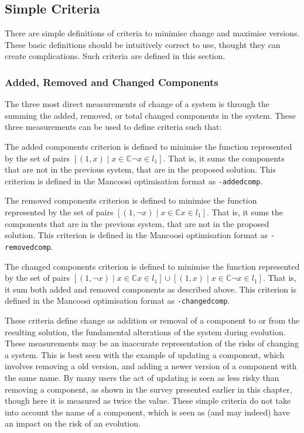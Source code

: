 \subsection{Simple Criteria}
There are simple definitions of criteria to minimise change and maximise versions.
These basic definitions should be intuitively correct to use, thought they can create complications.
Such criteria are defined in this section.

\subsubsection{Added, Removed and Changed Components}
The three most direct measurements of change of a system is through the summing the added, removed, or total changed components in the system.
These three measurements can be used to define criteria such that:
\begin{defs}
	  The added components criterion is defined to minimise the function
	represented by the set of pairs $[(1,x) \mid x \in \mathbb{C} \neg x \in l_1]$.
	That is, it sums the components that are not in the previous system, that are in the proposed solution.
	This criterion is defined in the Mancoosi optimisation format as \verb+-addedcomp+.

\end{defs}

\begin{defs}
	 The removed components criterion is defined to minimise the function 
	represented by the set of pairs $[(1,\neg x) \mid x \in \mathbb{C} x \in l_1]$.
	That is, it sums the components that are in the previous system, that are not in the proposed solution.
	This criterion is defined in the Mancoosi optimisation format as \verb+-removedcomp+.
\end{defs}

\begin{defs}
	 The changed components criterion is defined to minimise the function
	represented by the set of pairs $[(1,\neg x) \mid x \in \mathbb{C} x \in l_1] \cup [(1,x) \mid x \in \mathbb{C} \neg x \in l_1]$.
	That is, it sum both added and removed components as described above.
	This criterion is defined in the Mancoosi optimisation format as \verb+-changedcomp+.
\end{defs}

These criteria define change as addition or removal of a component to or from the resulting solution, the fundamental alterations of the system during evolution.
These measurements may be an inaccurate representation of the risks of changing a system.
This is best seen with the example of updating a component, which involves removing a old version, and adding a newer version of a component with the same name.
By many users the act of updating is seen as less risky than removing a component, as shown in the survey presented earlier in this chapter,
though here it is measured as twice the value.
These simple criteria do not take into account the name of a component, which is seen as (and may indeed) have an impact on the risk of an evolution.

